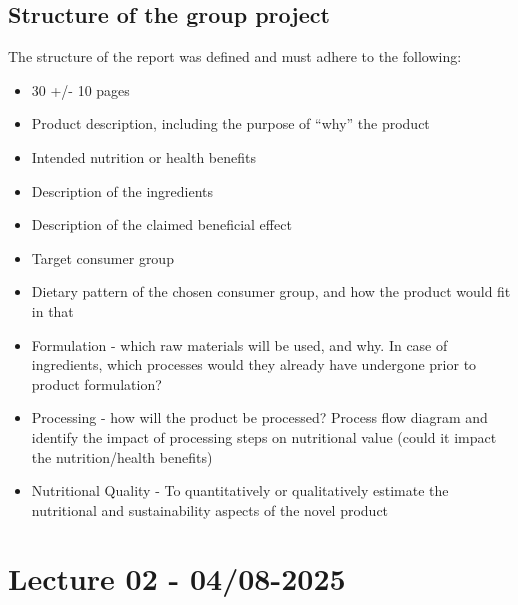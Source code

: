 \subsection*{Structure of the group project}
The structure of the report was defined and must adhere to the following:
\begin{itemize}
    \item 30 +/- 10 pages
    \item Product description, including the purpose of “why” the product
    \item Intended nutrition or health benefits
    \item Description of the ingredients
    \item Description of the claimed beneficial effect
    \item Target consumer group
    \item Dietary pattern of the chosen consumer group, and how the product would fit in that
    \item Formulation - which raw materials will be used, and why. In case of ingredients, which processes would they already have undergone prior to product formulation?
    \item Processing - how will the product be processed? Process flow diagram and identify the impact of processing steps on nutritional value (could it impact the nutrition/health benefits)
    \item Nutritional Quality - To quantitatively or qualitatively estimate the nutritional and sustainability aspects of the novel product
\end{itemize}

\section{Lecture 02 - 04/08-2025}

